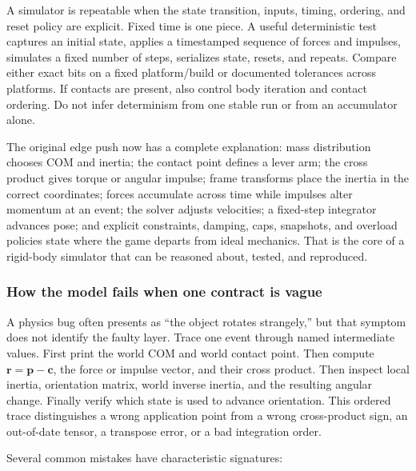 A simulator is repeatable when the state transition, inputs, timing, ordering, and reset policy are explicit. Fixed time is one piece. A useful deterministic test captures an initial state, applies a timestamped sequence of forces and impulses, simulates a fixed number of steps, serializes state, resets, and repeats. Compare either exact bits on a fixed platform/build or documented tolerances across platforms. If contacts are present, also control body iteration and contact ordering. Do not infer determinism from one stable run or from an accumulator alone.

The original edge push now has a complete explanation: mass distribution chooses COM and inertia; the contact point defines a lever arm; the cross product gives torque or angular impulse; frame transforms place the inertia in the correct coordinates; forces accumulate across time while impulses alter momentum at an event; the solver adjusts velocities; a fixed-step integrator advances pose; and explicit constraints, damping, caps, snapshots, and overload policies state where the game departs from ideal mechanics. That is the core of a rigid-body simulator that can be reasoned about, tested, and reproduced.

\subsubsection{How the model fails when one contract is vague}\label{how-the-model-fails-when-one-contract-is-vague}

A physics bug often presents as ``the object rotates strangely,'' but that symptom does not identify the faulty layer. Trace one event through named intermediate values. First print the world COM and world contact point. Then compute \(\mathbf r=\mathbf p-\mathbf c\), the force or impulse vector, and their cross product. Then inspect local inertia, orientation matrix, world inverse inertia, and the resulting angular change. Finally verify which state is used to advance orientation. This ordered trace distinguishes a wrong application point from a wrong cross-product sign, an out-of-date tensor, a transpose error, or a bad integration order.

Several common mistakes have characteristic signatures:

